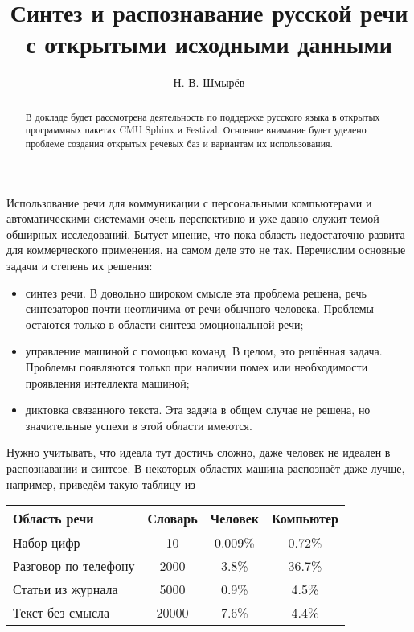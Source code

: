 \author{Н. В. Шмырёв}




\title{Синтез и распознавание русской речи с открытыми исходными данными}

\maketitle

\begin{abstract}
В докладе будет рассмотрена деятельность по поддержке русского
языка в открытых программных пакетах CMU Sphinx и Festival. Основное
внимание будет уделено проблеме создания открытых речевых баз и
вариантам их использования.
\end{abstract}

Использование речи для коммуникации с персональными компьютерами и 
автоматическими системами очень перспективно и уже давно служит темой обширных
исследований. Бытует мнение, что пока область недостаточно
развита для коммерческого применения, на самом деле это не так.
Перечислим основные задачи и степень их решения:

\begin{itemize}
\item синтез речи. В довольно широком смысле эта проблема решена, речь 
синтезаторов почти неотличима от речи обычного человека. Проблемы
остаются только в области синтеза эмоциональной речи;
\item управление машиной с помощью команд. В целом, это решённая задача. 
Проблемы появляются только при наличии помех или необходимости
проявления интеллекта машиной;
\item диктовка связанного текста. Эта задача в общем случае не решена,
но значительные успехи в этой области имеются.
\end{itemize}

Нужно учитывать, что идеала тут достичь сложно, даже человек не идеален в
распознавании и синтезе. В некоторых областях машина распознаёт даже
лучше, например, приведём такую таблицу из \cite{SLP}

\begin{tabular}{|l|c|c|c|}
\hline
Область речи & Словарь & Человек & Компьютер \\
\hline
Набор цифр & 10 & 0.009\% & 0.72\% \\
\hline
Разговор по телефону & 2000 & 3.8\% & 36.7\% \\
\hline
Статьи из журнала  & 5000 & 0.9\% & 4.5\% \\
\hline
Текст без смысла & 20000 & 7.6\% & 4.4\% \\
\hline
\end{tabular}

